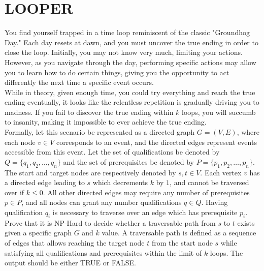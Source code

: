 \documentclass[11pt]{article}
\begin{document}
	\section*{LOOPER}
	You find yourself trapped in a time loop reminiscent of the classic "Groundhog Day." Each day resets at dawn, and you must uncover the true ending in order to close the loop. Initially, you may not know very much, limiting your actions. However, as you navigate through the day, performing specific actions may allow you to learn how to do certain things, giving you the opportunity to act differently the next time a specific event occurs.\\
	
	\noindent
	While in theory, given enough time, you could try everything and reach the true ending eventually, it looks like the relentless repetition is gradually driving you to madness. If you fail to discover the true ending within $k$ loops, you will succumb to insanity, making it impossible to ever achieve the true ending.\\
	
	\noindent
	Formally, let this scenario be represented as a directed graph $G=(V,E)$, where each node $v \in V$ corresponds to an event, and the directed edges represent events accessible from this event. Let the set of qualifications be denoted by $Q= \{q_1, q_2,\ldots,q_n\}$ and the set of prerequisites be denoted by $P=\{p_1, p_2,\ldots,p_n\}$. The start and target nodes are respectively denoted by $s,t\in V$. Each vertex $v$ has a directed edge leading to $s$ which decrements $k$ by $1$, and cannot be traversed over if $k\leq0$. All other directed edges may require any number of prerequisites $p \in P$, and all nodes can grant any number qualifications $q \in Q$. Having qualification $q_i$ is necessary to traverse over an edge which has prerequisite $p_i$.\\ 
	
	\noindent
	Prove that it is NP-Hard to decide whether a traversable path from $s$ to $t$ exists given a specific graph $G$ and $k$ value. A traversable path is defined as a sequence of edges that allows reaching the target node $t$ from the start node $s$ while satisfying all qualifications and prerequisites within the limit of $k$ loops. The output should be either TRUE or FALSE.
\end{document}
